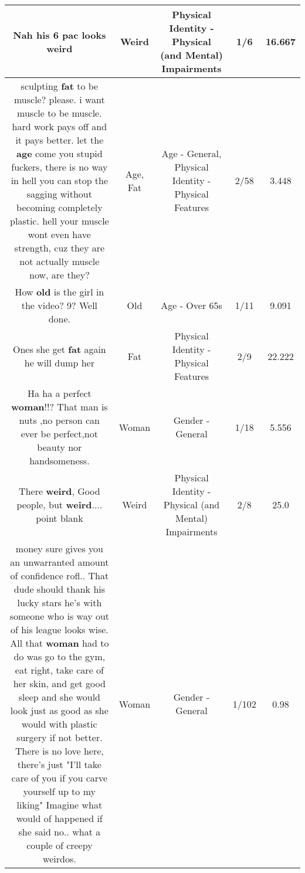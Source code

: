 \documentclass[11pt]{article}
\newlength\mylength
\begin{document}
\begin{center}
\begin{longtable}{|C{.65\mylength}|C{.30\mylength}|C{.12\mylength}|C{.12\mylength}|C{.12\mylength}|}
  \small Nah his 6 pac looks weird\normalsize   & Weird & Physical Identity - Physical (and Mental) Impairments & 1/6 & 16.667 \\  \hline
  \small sculpting \textbf{fat} to be muscle? please. i want muscle to be muscle. hard work pays off and it pays better. let the \textbf{age} come you stupid fuckers, there is no way in hell you can stop the sagging without becoming completely plastic. hell your muscle wont even have strength, cuz they are not actually muscle now, are they?\normalsize   & Age, Fat & Age - General, Physical Identity - Physical Features & 2/58 & 3.448 \\  \hline
  \small How \textbf{old} is the girl in the video? 9? Well done.\normalsize   & Old & Age - Over 65s & 1/11 & 9.091 \\  \hline
  \small Ones she get \textbf{fat} again he will dump her\normalsize   & Fat & Physical Identity - Physical Features & 2/9 & 22.222 \\  \hline
  \small Ha ha a perfect \textbf{woman}!!? That man is nuts ,no person can ever be perfect,not beauty nor handsomeness.\normalsize   & Woman & Gender - General & 1/18 & 5.556 \\  \hline
  \small There \textbf{weird}, Good people, but \textbf{weird}.... point blank\normalsize   & Weird & Physical Identity - Physical (and Mental) Impairments & 2/8 & 25.0 \\  \hline
  \small money sure gives you an unwarranted amount of confidence rofl.. That dude should thank his lucky stars he's with someone who is way out of his league looks wise. All that \textbf{woman} had to do was go to the gym, eat right, take care of her skin, and get good sleep and she would look just as good as she would with plastic surgery if not better. There is no love here, there's just "I'll take care of you if you carve yourself up to my liking" Imagine what would of happened if she said no.. what a couple of creepy weirdos.\normalsize   & Woman & Gender - General & 1/102 & 0.98 \\  \hline

\end{longtable}
\end{center}
\end{document}
